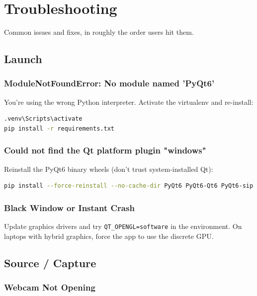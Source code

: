 \documentclass[11pt,a4paper,openany]{report}
\begin{document}
\chapter{Troubleshooting}

Common issues and fixes, in roughly the order users hit them.

\section{Launch}

\subsection{ModuleNotFoundError: No module named 'PyQt6'}

You're using the wrong Python interpreter. Activate the virtualenv and
re-install:

\begin{lstlisting}[language=bash]
.venv\Scripts\activate
pip install -r requirements.txt
\end{lstlisting}

\subsection{Could not find the Qt platform plugin "windows"}

Reinstall the PyQt6 binary wheels (don't trust system-installed Qt):

\begin{lstlisting}[language=bash]
pip install --force-reinstall --no-cache-dir PyQt6 PyQt6-Qt6 PyQt6-sip
\end{lstlisting}

\subsection{Black Window or Instant Crash}

Update graphics drivers and try \texttt{QT\_OPENGL=software} in the
environment. On laptops with hybrid graphics, force the app to use the
discrete GPU.

\section{Source / Capture}

\subsection{Webcam Not Opening}
\end{document}
